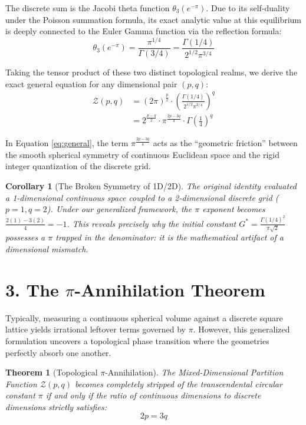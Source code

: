 \documentclass[12pt]{article}
\newtheorem{theorem}{Theorem}
\newtheorem{corollary}{Corollary}
\begin{document}
The discrete sum is the Jacobi theta function $\theta_3(e^{-\pi})$. Due to its self-duality under the Poisson summation formula, its exact analytic value at this equilibrium is deeply connected to the Euler Gamma function via the reflection formula:
\begin{equation}
    \theta_3(e^{-\pi}) = \frac{\pi^{1/4}}{\Gamma(3/4)} = \frac{\Gamma(1/4)}{2^{1/2}\pi^{3/4}}
\end{equation}

Taking the tensor product of these two distinct topological realms, we derive the exact general equation for any dimensional pair $(p, q)$:
\begin{align}
    \mathcal{Z}(p, q) &= (2\pi)^{\frac{p}{2}} \cdot \left( \frac{\Gamma(1/4)}{2^{1/2}\pi^{3/4}} \right)^q \nonumber \\
    &= 2^{\frac{p-q}{2}} \cdot \pi^{\frac{2p-3q}{4}} \cdot \Gamma\left(\frac{1}{4}\right)^q \label{eq:general}
\end{align}

In Equation \ref{eq:general}, the term $\pi^{\frac{2p-3q}{4}}$ acts as the ``geometric friction'' between the smooth spherical symmetry of continuous Euclidean space and the rigid integer quantization of the discrete grid.

\begin{corollary}[The Broken Symmetry of 1D/2D]
The original identity evaluated a 1-dimensional continuous space coupled to a 2-dimensional discrete grid ($p=1, q=2$). Under our generalized framework, the $\pi$ exponent becomes $\frac{2(1)-3(2)}{4} = -1$. This reveals precisely why the initial constant $G^* = \frac{\Gamma(1/4)^2}{\pi\sqrt{2}}$ possesses a $\pi$ trapped in the denominator: it is the mathematical artifact of a dimensional mismatch.
\end{corollary}

\section*{3. The $\pi$-Annihilation Theorem}
Typically, measuring a continuous spherical volume against a discrete square lattice yields irrational leftover terms governed by $\pi$. However, this generalized formulation uncovers a topological phase transition where the geometries perfectly absorb one another.

\begin{theorem}[Topological $\pi$-Annihilation]
The Mixed-Dimensional Partition Function $\mathcal{Z}(p, q)$ becomes completely stripped of the transcendental circular constant $\pi$ if and only if the ratio of continuous dimensions to discrete dimensions strictly satisfies:
\begin{equation}
    2p = 3q
\end{equation}
\end{theorem}
\end{document}
